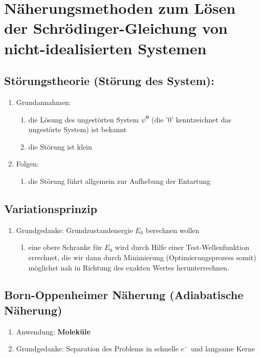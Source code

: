 \section{Näherungsmethoden zum Lösen der Schrödinger-Gleichung von nicht-idealisierten Systemen}
\subsection{Störungstheorie (Störung des System):}
\begin{enumerate}
    \item Grundannahmen:
    \begin{enumerate}
        \item die Lösung des ungestörten System $\psi^\textbf{0}$ (die '0' kenntzeichnet das ungestörte System) ist bekannt
        \item die Störung ist klein
    \end{enumerate}
    \item Folgen:
    \begin{enumerate}
        \item die Störung führt allgemein zur Aufhebung der Entartung 
    \end{enumerate}
\end{enumerate} 

\subsection{Variationsprinzip}
\begin{enumerate}
    \item Grundgedanke: Grundzustandenergie $E_0$ berechnen wollen
    \begin{enumerate}
        \item eine obere Schranke für $E_0$ wird durch Hilfe einer Test-Wellenfunktion errechnet, die wir dann durch Minimierung 
        (Optimierungsprozess somit) möglichst nah in Richtung des exakten Wertes herunterrechnen.
    \end{enumerate}
\end{enumerate}

\subsection{Born-Oppenheimer Näherung (Adiabatische Näherung)}
\begin{enumerate}
    \item Anwendung: \textbf{Moleküle}
    \item Grundgedanke: Separation des Problems in schnelle $e^-$ und langsame Kerne
\end{enumerate}

\newpage